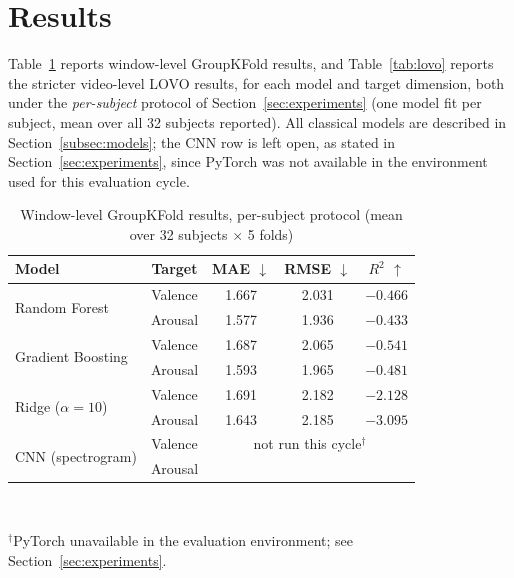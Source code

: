 \documentclass[conference]{IEEEtran}
\begin{document}
\section{Results}
\label{sec:results}

Table~\ref{tab:window} reports window-level GroupKFold results, and
Table~\ref{tab:lovo} reports the stricter video-level LOVO results, for
each model and target dimension, both under the \emph{per-subject}
protocol of Section~\ref{sec:experiments} (one model fit per subject,
mean over all 32 subjects reported). All classical models are described
in Section~\ref{subsec:models}; the CNN row is left open, as stated in
Section~\ref{sec:experiments}, since PyTorch was not available in the
environment used for this evaluation cycle.

\begin{table}[!t]
\centering
\caption{Window-level GroupKFold results, per-subject protocol (mean over 32 subjects $\times$ 5 folds)}
\label{tab:window}
\small
\begin{tabular}{lcccc}
\toprule
Model & Target & MAE $\downarrow$ & RMSE $\downarrow$ & $R^2$ $\uparrow$ \\
\midrule
\multirow{2}{*}{Random Forest} & Valence & 1.667 & 2.031 & $-0.466$ \\
                                & Arousal & 1.577 & 1.936 & $-0.433$ \\
\multirow{2}{*}{Gradient Boosting} & Valence & 1.687 & 2.065 & $-0.541$ \\
                                    & Arousal & 1.593 & 1.965 & $-0.481$ \\
\multirow{2}{*}{Ridge ($\alpha=10$)} & Valence & 1.691 & 2.182 & $-2.128$ \\
                                    & Arousal & 1.643 & 2.185 & $-3.095$ \\
\multirow{2}{*}{CNN (spectrogram)} & Valence & \multicolumn{3}{c}{not run this cycle$^{\dagger}$} \\
                                    & Arousal & & & \\
\bottomrule
\end{tabular}
\\[1mm]
\raggedright\footnotesize $^{\dagger}$PyTorch unavailable in the evaluation environment; see Section~\ref{sec:experiments}.
\end{table}
\end{document}
